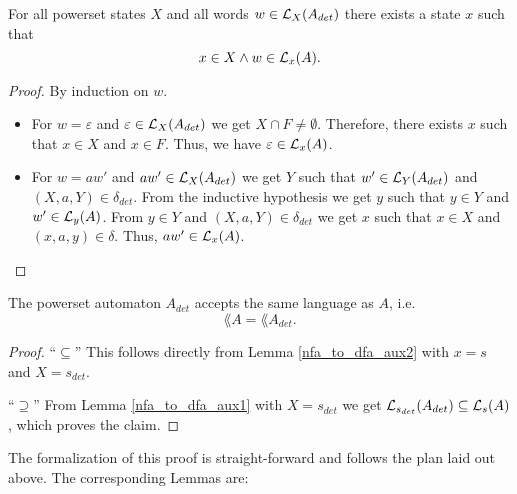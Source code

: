 \begin{lemma}
    \label{nfa_to_dfa_aux1}
    For all powerset states $X$ and all words $w \in \mathcal{L}_{X}(A_{det})$ there exists a state $x$ such that 
    \begin{equation*}
        x \in X \wedge
        w \in \mathcal{L}_{x}(A).
    \end{equation*}
\end{lemma}

\begin{proof}
    By induction on $w$. %
    \begin{itemize}
        \item
            For $w = \varepsilon$ and $\varepsilon \in \mathcal{L}_{X}(A_{det})$ we get  $X \cap F \neq \emptyset$.
            Therefore, there exists $x$ such that $x \in X$ and $x \in F$.
            Thus, we have $\varepsilon \in \mathcal{L}_{x}(A)$.
        \item
            For $w = a w'$ and $a w' \in \mathcal{L}_{X}(A_{det})$ we get $Y$ such that $w' \in \mathcal{L}_{Y}(A_{det})$ and $(X,a,Y) \in \delta_{det}$.
            From the inductive hypothesis we get $y$ such that $y \in Y$ and $w' \in \mathcal{L}_{y}(A)$.
            From $y \in Y$ and $(X, a, Y) \in \delta_{det}$ we get $x$ such that $x \in X$ and $(x, a, y) \in \delta$.
            Thus, $a w' \in \mathcal{L}_{x}(A)$.
    \end{itemize}
\end{proof}

\begin{theorem}
    The powerset automaton $A_{det}$ accepts the same language as $A$, i.e.
    \begin{equation*}        
        \lang{A} = \lang{A_{det}}.        
    \end{equation*}
\end{theorem}
\begin{proof}
    ``$\subseteq$'' 
    This follows directly from Lemma \ref{nfa_to_dfa_aux2} with $x = s$ and $X = {s}_{det}$.

    ``$\supseteq$''
    From Lemma \ref{nfa_to_dfa_aux1} with $X = {s}_{det}$ we get 
    $\mathcal{L}_{s_{det}}(A_{det}) \subseteq \mathcal{L}_{s}(A)$, which proves the claim.
\end{proof}


The formalization of this proof is straight-forward and follows the plan laid out above. 
The corresponding Lemmas are:


